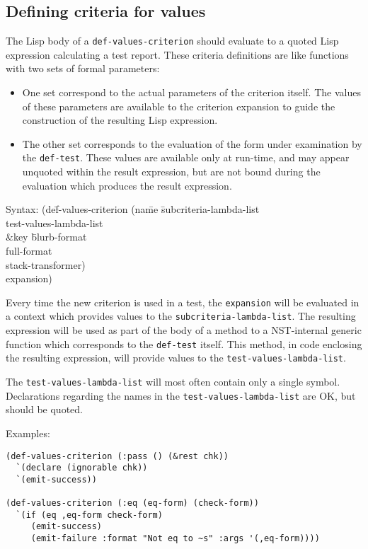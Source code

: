\subsection{Defining criteria for values}
\label{sec:def-values-criterion}
The Lisp body of a \texttt{def-values-criterion} should evaluate to a
quoted Lisp expression calculating a test report.  These criteria
definitions are like functions with two sets of formal parameters:
\begin{itemize}
\item One set correspond to the actual parameters of the criterion
  itself.  The values of these parameters are available to the
  criterion expansion to guide the construction of the resulting Lisp
  expression.
\item The other set corresponds to the evaluation of the form under
  examination by the \texttt{def-test}.  These values are available
  only at run-time, and may appear unquoted within the result
  expression, but are not bound during the evaluation which produces
  the result expression.
\end{itemize}
% 
{\ttfamily\begin{tabbing}
\textrm{Syntax: 
}(de\=f-values-criterion (na\=me \=subcriteria-lambda-list
\\ \> \> \> test-values-lambda-list
\\ \> \> \&key \= blurb-format
\\ \> \>        \> full-format
\\ \> \>        \> stack-transformer)
\\ \> expansion)
\end{tabbing}}
%
Every time the new criterion is used in a test, the \texttt{expansion}
will be evaluated in a context which provides values to the
\texttt{subcriteria-lambda-list}.  The resulting expression will be
used as part of the body of a method to a NST-internal generic
function which corresponds to the \texttt{def-test} itself.  This
method, in code enclosing the resulting expression, will provide
values to the \texttt{test-values-lambda-list}.

The \texttt{test-values-lambda-list} will most often contain only a
single symbol.  Declarations regarding the names in the
\texttt{test-values-lambda-list} are OK, but should be quoted.

Examples:
\begin{verbatim}
(def-values-criterion (:pass () (&rest chk))
  `(declare (ignorable chk))
  `(emit-success))

(def-values-criterion (:eq (eq-form) (check-form))
  `(if (eq ,eq-form check-form)
     (emit-success)
     (emit-failure :format "Not eq to ~s" :args '(,eq-form))))
\end{verbatim}

